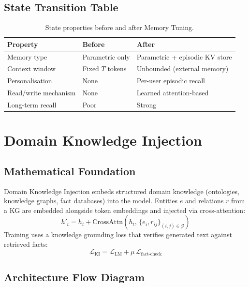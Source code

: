 \subsection{State Transition Table}
\begin{table}[h]\centering
\begin{tabular}{lll}\toprule
\textbf{Property} & \textbf{Before} & \textbf{After}\\\midrule
Memory type & Parametric only & Parametric + episodic KV store\\
Context window & Fixed $T$ tokens & Unbounded (external memory)\\
Personalisation & None & Per-user episodic recall\\
Read/write mechanism & None & Learned attention-based\\
Long-term recall & Poor & Strong\\\bottomrule
\end{tabular}
\caption{State properties before and after Memory Tuning.}
\end{table}

\newpage
\section{Domain Knowledge Injection}

\subsection{Mathematical Foundation}
Domain Knowledge Injection embeds structured domain knowledge (ontologies, knowledge graphs, fact databases) into the model. Entities $e$ and relations $r$ from a KG are embedded alongside token embeddings and injected via cross-attention:
\begin{equation}
  h'_t = h_t + \text{CrossAttn}(h_t,\, \{e_i, r_{ij}\}_{(i,j) \in \mathcal{G}})
\end{equation}
Training uses a knowledge grounding loss that verifies generated text against retrieved facts:
\begin{equation}
  \mathcal{L}_{\text{KI}} = \mathcal{L}_{\text{LM}} + \mu\,\mathcal{L}_{\text{fact-check}}
\end{equation}

\subsection{Architecture Flow Diagram}

